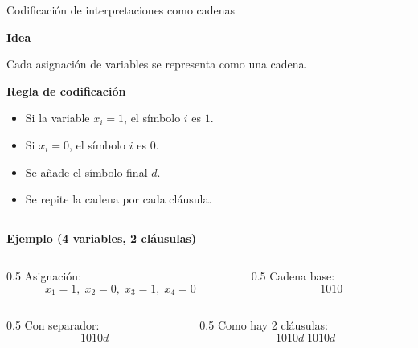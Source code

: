 \documentclass{beamer}
\begin{document}
\begin{frame}
    \tableofcontents
\end{frame}

\begin{frame}{Codificación de interpretaciones como cadenas}

    \textbf{Idea}

    \pause

    Cada asignación de variables se representa como una cadena.

    \vspace{0.3cm}

    \pause

    \textbf{Regla de codificación}

    \begin{itemize}
        \item Si la variable $x_i = 1$, el símbolo $i$ es $1$.
              \pause
        \item Si $x_i = 0$, el símbolo $i$ es $0$.
              \pause
        \item Se añade el símbolo final $d$.
              \pause
        \item Se repite la cadena por cada cláusula.
    \end{itemize}

    \vspace{0.2cm}

    \pause

    \hrule
    \vspace{0.2cm}

    \textbf{Ejemplo (4 variables, 2 cláusulas)}

    \pause

    \begin{columns}
        \begin{column}{0.5\textwidth}
            Asignación:
            \[
                x_1=1,\; x_2=0,\; x_3=1,\; x_4=0
            \]
        \end{column}
        \pause
        \begin{column}{0.5\textwidth}
            Cadena base:
            \[
                1010
            \]

            \pause
        \end{column}
    \end{columns}
    \vspace{0.2cm}
    \begin{columns}
        \begin{column}{0.5\textwidth}
            Con separador:
            \[
                1010d
            \]

            \pause

        \end{column}
        \begin{column}{0.5\textwidth}
            Como hay 2 cláusulas:
            \[
                1010d\;1010d
            \]
        \end{column}
    \end{columns}
\end{frame}
\end{document}
